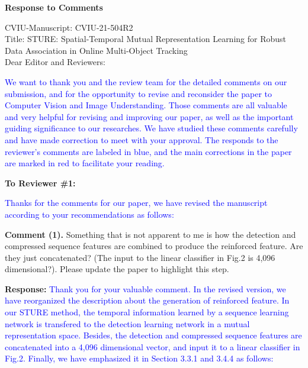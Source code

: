 \documentclass[12pt,journal,onecolumn]{IEEEtran}
\begin{document}
\begin{center}
	\textbf{\LARGE Response to Comments} 
\end{center}
\vspace{8pt} 

\noindent CVIU-Manuscript: CVIU-21-504R2 \\

\noindent Title: STURE: Spatial-Temporal Mutual Representation Learning for Robust Data Association in Online Multi-Object Tracking \\

\noindent Dear Editor and Reviewers:

\textcolor{blue}{
We want to thank you and the review team for the detailed comments on our submission, and for the opportunity to revise and reconsider the paper to Computer Vision and Image Understanding.  
Those comments are all valuable and very helpful for revising and improving our paper, as well as the important guiding significance to our researches. 
We have studied these comments carefully and have made correction to meet with your approval. 
The responds to the reviewer's comments are labeled in blue, 
and the main corrections in the paper are marked in red to facilitate your reading. 
}

\vspace{8pt} 

\newpage





\textbf{To Reviewer \#1:}

\textcolor{blue}{Thanks for the comments for our paper, we have revised the manuscript according to your recommendations as follows:}

\textbf{Comment (1).} Something that is not apparent to me is how the detection and compressed sequence features are combined to produce the reinforced feature. 
Are they just concatenated? 
(The input to the linear classifier in Fig.2 is 4,096 dimensional?). 
Please update the paper to highlight this step.


\textbf{Response:} \textcolor{blue}{Thank you for your valuable comment.
In the revised version, we have reorganized the description about the generation of reinforced feature.
In our STURE method, the temporal information learned by a sequence learning network is transfered to the detection learning network in a mutual representation space.
Besides, the detection and compressed sequence features are concatenated into a 4,096 dimensional vector, and input it to a linear classifier in Fig.2.
Finally, we have emphasized it in Section 3.3.1 and 3.4.4 as follows: 
}
\end{document}
